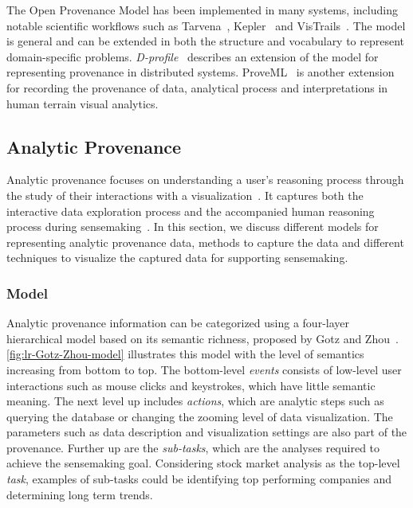 The Open Provenance Model has been implemented in many systems, including notable scientific workflows such as Tarvena~\cite{Zhao2008}, Kepler~\cite{Bowers2006} and VisTrails~\cite{Bavoil2005}. The model is general and can be extended in both the structure and vocabulary to represent domain-specific problems. \emph{D-profile}~\cite{Groth2011} describes an extension of the model for representing provenance in distributed systems. ProveML~\cite{Walker2013} is another extension for recording the provenance of data, analytical process and interpretations in human terrain visual analytics.


\subsection{Analytic Provenance}
\label{sec:lr-analytic-provenance}
Analytic provenance focuses on understanding a user's reasoning process through the study of their interactions with a visualization~\cite{North2011}. It captures both the interactive data exploration process and the accompanied human reasoning process during sensemaking~\cite{Xu2015}. In this section, we discuss different models for representing analytic provenance data, methods to capture the data and different techniques to visualize the captured data for supporting sensemaking.

\subsubsection{Model}
\label{sec:lr-analytic-provenance-model}
Analytic provenance information can be categorized using a four-layer hierarchical model based on its semantic richness, proposed by Gotz and Zhou~\cite{Gotz2009}. \autoref{fig:lr-Gotz-Zhou-model} illustrates this model with the level of semantics increasing from bottom to top. The bottom-level \emph{events} consists of low-level user interactions such as mouse clicks and keystrokes, which have little semantic meaning. The next level up includes \emph{actions}, which are analytic steps such as querying the database or changing the zooming level of data visualization. The parameters such as data description and visualization settings are also part of the provenance. Further up are the \emph{sub-tasks}, which are the analyses required to achieve the sensemaking goal. Considering stock market analysis as the top-level \emph{task}, examples of sub-tasks could be identifying top performing companies and determining long term trends. 

